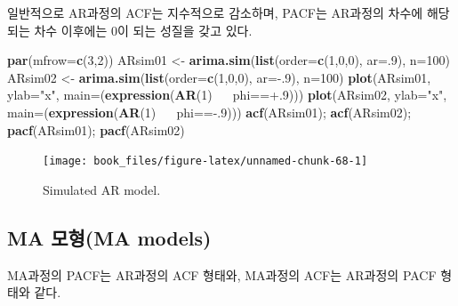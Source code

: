 \documentclass[b5paper,]{book}
\makeatletter
\newenvironment{Shaded}{\begin{snugshade}}{\end{snugshade}}
\newcommand{\KeywordTok}[1]{\textcolor[rgb]{0.13,0.29,0.53}{\textbf{{#1}}}}
\newcommand{\DataTypeTok}[1]{\textcolor[rgb]{0.13,0.29,0.53}{{#1}}}
\newcommand{\DecValTok}[1]{\textcolor[rgb]{0.00,0.00,0.81}{{#1}}}
\newcommand{\StringTok}[1]{\textcolor[rgb]{0.31,0.60,0.02}{{#1}}}
\newcommand{\ErrorTok}[1]{\textcolor[rgb]{0.64,0.00,0.00}{\textbf{{#1}}}}
\newcommand{\NormalTok}[1]{{#1}}
\newenvironment{kframe}{%
\medskip{}
\setlength{\fboxsep}{.8em}
 \def\at@end@of@kframe{}%
 \ifinner\ifhmode%
  \def\at@end@of@kframe{\end{minipage}}%
  \begin{minipage}{\columnwidth}%
 \fi\fi%
 \def\FrameCommand##1{\hskip\@totalleftmargin \hskip-\fboxsep
 \colorbox{shadecolor}{##1}\hskip-\fboxsep
     \hskip-\linewidth \hskip-\@totalleftmargin \hskip\columnwidth}%
 \MakeFramed {\advance\hsize-\width
   \@totalleftmargin\z@ \linewidth\hsize
   \@setminipage}}%
 {\par\unskip\endMakeFramed%
 \at@end@of@kframe}
\renewenvironment{Shaded}{\begin{kframe}}{\end{kframe}}
\theoremstyle{definition}
\theoremstyle{definition}
\theoremstyle{definition}
\theoremstyle{remark}
\makeatother
\begin{document}
일반적으로 AR과정의 ACF는 지수적으로 감소하며, PACF는 AR과정의 차수에
해당되는 차수 이후에는 0이 되는 성질을 갖고 있다.

\begin{Shaded}
\begin{Highlighting}[]
\KeywordTok{par}\NormalTok{(}\DataTypeTok{mfrow=}\KeywordTok{c}\NormalTok{(}\DecValTok{3}\NormalTok{,}\DecValTok{2}\NormalTok{))}
\NormalTok{ARsim01 <-}\StringTok{ }\KeywordTok{arima.sim}\NormalTok{(}\KeywordTok{list}\NormalTok{(}\DataTypeTok{order=}\KeywordTok{c}\NormalTok{(}\DecValTok{1}\NormalTok{,}\DecValTok{0}\NormalTok{,}\DecValTok{0}\NormalTok{), }\DataTypeTok{ar=}\NormalTok{.}\DecValTok{9}\NormalTok{), }\DataTypeTok{n=}\DecValTok{100}\NormalTok{)}
\NormalTok{ARsim02 <-}\StringTok{ }\KeywordTok{arima.sim}\NormalTok{(}\KeywordTok{list}\NormalTok{(}\DataTypeTok{order=}\KeywordTok{c}\NormalTok{(}\DecValTok{1}\NormalTok{,}\DecValTok{0}\NormalTok{,}\DecValTok{0}\NormalTok{), }\DataTypeTok{ar=}\NormalTok{-.}\DecValTok{9}\NormalTok{), }\DataTypeTok{n=}\DecValTok{100}\NormalTok{)}
\KeywordTok{plot}\NormalTok{(ARsim01, }\DataTypeTok{ylab=}\StringTok{"x"}\NormalTok{, }\DataTypeTok{main=}\NormalTok{(}\KeywordTok{expression}\NormalTok{(}\KeywordTok{AR}\NormalTok{(}\DecValTok{1}\NormalTok{)~}\ErrorTok{~~}\NormalTok{phi==+.}\DecValTok{9}\NormalTok{)))}
\KeywordTok{plot}\NormalTok{(ARsim02, }\DataTypeTok{ylab=}\StringTok{"x"}\NormalTok{, }\DataTypeTok{main=}\NormalTok{(}\KeywordTok{expression}\NormalTok{(}\KeywordTok{AR}\NormalTok{(}\DecValTok{1}\NormalTok{)~}\ErrorTok{~~}\NormalTok{phi==-.}\DecValTok{9}\NormalTok{)))}
\KeywordTok{acf}\NormalTok{(ARsim01); }\KeywordTok{acf}\NormalTok{(ARsim02); }\KeywordTok{pacf}\NormalTok{(ARsim01); }\KeywordTok{pacf}\NormalTok{(ARsim02)}
\end{Highlighting}
\end{Shaded}

\begin{figure}

{\centering \texttt{[image: book\_files/figure-latex/unnamed-chunk-68-1]} 

}

\caption{Simulated AR model.}\label{fig:unnamed-chunk-68}
\end{figure}

\subsection{MA 모형(MA models)}\label{ma-ma-models}

MA과정의 PACF는 AR과정의 ACF 형태와, MA과정의 ACF는 AR과정의 PACF 형태와
같다.
\end{document}
